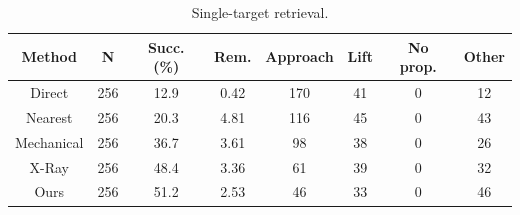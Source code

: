 \begin{table}[htbp]
  \centering
  \caption{Single-target retrieval.}
  \label{tab:fresh_mujoco_100target_terminal}
  \footnotesize
  \setlength{\tabcolsep}{3.5pt}
  \begin{tabular}{cccccccc}
    \toprule
    Method & N & Succ. (\%) & Rem. & Approach & Lift & No prop. & Other \\
    \midrule
    Direct & 256 & 12.9 & 0.42 & 170 & 41 & 0 & 12 \\
    Nearest & 256 & 20.3 & 4.81 & 116 & 45 & 0 & 43 \\
    Mechanical & 256 & 36.7 & 3.61 & 98 & 38 & 0 & 26 \\
    X-Ray & 256 & 48.4 & 3.36 & 61 & 39 & 0 & 32 \\
    Ours & 256 & 51.2 & 2.53 & 46 & 33 & 0 & 46 \\
    \bottomrule
  \end{tabular}
\end{table}
